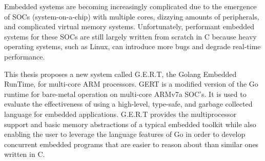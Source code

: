 % 
% 
%

Embedded systems are becoming increasingly complicated due to the emergence of
SOCs (system-on-a-chip) with multiple cores, dizzying amounts of peripherals, and
complicated virtual memory systems. Unfortunately, performant embedded systems
for these SOCs are still largely written from scratch in C because heavy
operating systems, such as Linux, can introduce more bugs and degrade real-time
performance.

This thesis proposes a new system called G.E.R.T, the Golang Embedded RunTime,
for multi-core ARM processors.
GERT is a modified version of the Go runtime for
bare-metal operation on multi-core ARMv7a SOC's. It is used to evaluate
the effectiveness of using a high-level, type-safe, and garbage collected
language for embedded applications. G.E.R.T
provides the multiprocessor support and basic memory abstractions of a
typical embedded toolkit while also enabling the user to leverage the language features
of Go in order to develop
concurrent embedded programs that are easier to reason about than similar ones
written in C.

